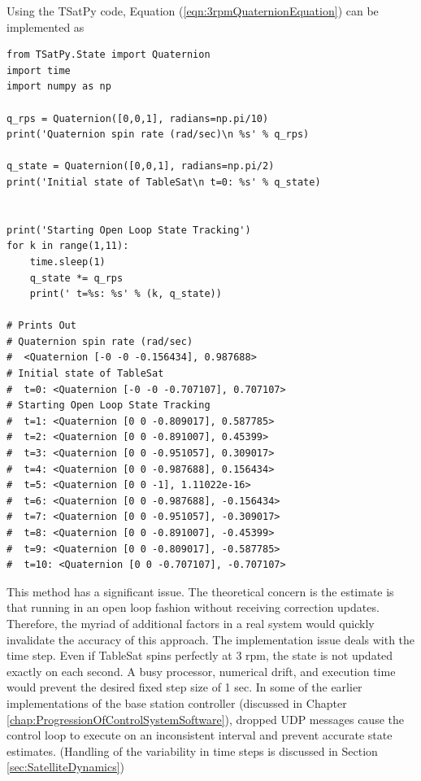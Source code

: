 Using the TSatPy code, Equation (\ref{eqn:3rpmQuaternionEquation}) can be implemented as

\begin{singlespace}
  \begin{verbatim}
from TSatPy.State import Quaternion
import time
import numpy as np

q_rps = Quaternion([0,0,1], radians=np.pi/10)
print('Quaternion spin rate (rad/sec)\n %s' % q_rps)

q_state = Quaternion([0,0,1], radians=np.pi/2)
print('Initial state of TableSat\n t=0: %s' % q_state)


print('Starting Open Loop State Tracking')
for k in range(1,11):
    time.sleep(1)
    q_state *= q_rps
    print(' t=%s: %s' % (k, q_state))

# Prints Out
# Quaternion spin rate (rad/sec)
#  <Quaternion [-0 -0 -0.156434], 0.987688>
# Initial state of TableSat
#  t=0: <Quaternion [-0 -0 -0.707107], 0.707107>
# Starting Open Loop State Tracking
#  t=1: <Quaternion [0 0 -0.809017], 0.587785>
#  t=2: <Quaternion [0 0 -0.891007], 0.45399>
#  t=3: <Quaternion [0 0 -0.951057], 0.309017>
#  t=4: <Quaternion [0 0 -0.987688], 0.156434>
#  t=5: <Quaternion [0 0 -1], 1.11022e-16>
#  t=6: <Quaternion [0 0 -0.987688], -0.156434>
#  t=7: <Quaternion [0 0 -0.951057], -0.309017>
#  t=8: <Quaternion [0 0 -0.891007], -0.45399>
#  t=9: <Quaternion [0 0 -0.809017], -0.587785>
#  t=10: <Quaternion [0 0 -0.707107], -0.707107>
  \end{verbatim}
  \nocite{minted}
\end{singlespace}

This method has a significant issue.  The theoretical concern is the estimate is that running in an open loop fashion without receiving correction updates.  Therefore, the myriad of additional factors in a real system would quickly invalidate the accuracy of this approach.  The implementation issue deals with the time step.  Even if TableSat spins perfectly at 3 rpm, the state is not updated exactly on each second.  A busy processor, numerical drift, and execution time would prevent the desired fixed step size of 1 sec.  In some of the earlier implementations of the base station controller (discussed in Chapter \ref{chap:ProgressionOfControlSystemSoftware}), dropped UDP messages cause the control loop to execute on an inconsistent interval and prevent accurate state estimates.  (Handling of the variability in time steps is discussed in Section \ref{sec:SatelliteDynamics})


